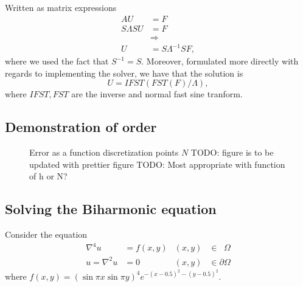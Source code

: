 Written as matrix expressions
\begin{align}
  A U &= F\\
  S\Lambda S U &= F\\
  &\Rightarrow\\
  U &= S\Lambda^{-1} S F,
\end{align}
where we used the fact that $S^{-1} = S$.
Moreover, formulated more directly with regards to implementing the solver, we have that the solution is
$$
U = IFST(FST(F) / \Lambda),
$$
where $IFST, FST$ are the inverse and normal fast sine tranform.

\subsection{Demonstration of order}
\begin{figure}[h]
  \centering
  
  \caption{Error as a function discretization points $N$
    TODO: figure is to be updated with prettier figure
    TODO: Most appropriate with function of h or N?}
\end{figure}


\subsection{Solving the Biharmonic equation}
Consider the equation
\begin{align*}
  \nabla^4 u &= f(x, y) &(x, y) &\in \phantom{\partial}\Omega\\
  u = \nabla^2u &= 0  &(x, y) &\in \partial\Omega
\end{align*}
where $f(x, y) =
\left(
\sin \pi x
\sin \pi y
\right)^4
e^{-(x-0.5)^2 - (y-0.5)^2}
$.

